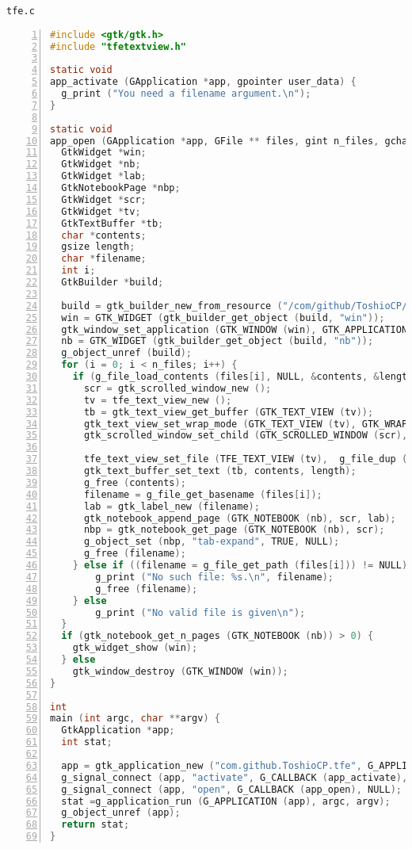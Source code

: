 \passthrough{\lstinline!tfe.c!}

\begin{lstlisting}[language=C, numbers=left]
#include <gtk/gtk.h>
#include "tfetextview.h"

static void
app_activate (GApplication *app, gpointer user_data) {
  g_print ("You need a filename argument.\n");
}

static void
app_open (GApplication *app, GFile ** files, gint n_files, gchar *hint, gpointer user_data) {
  GtkWidget *win;
  GtkWidget *nb;
  GtkWidget *lab;
  GtkNotebookPage *nbp;
  GtkWidget *scr;
  GtkWidget *tv;
  GtkTextBuffer *tb;
  char *contents;
  gsize length;
  char *filename;
  int i;
  GtkBuilder *build;

  build = gtk_builder_new_from_resource ("/com/github/ToshioCP/tfe3/tfe.ui");
  win = GTK_WIDGET (gtk_builder_get_object (build, "win"));
  gtk_window_set_application (GTK_WINDOW (win), GTK_APPLICATION (app));
  nb = GTK_WIDGET (gtk_builder_get_object (build, "nb"));
  g_object_unref (build);
  for (i = 0; i < n_files; i++) {
    if (g_file_load_contents (files[i], NULL, &contents, &length, NULL, NULL)) {
      scr = gtk_scrolled_window_new ();
      tv = tfe_text_view_new ();
      tb = gtk_text_view_get_buffer (GTK_TEXT_VIEW (tv));
      gtk_text_view_set_wrap_mode (GTK_TEXT_VIEW (tv), GTK_WRAP_WORD_CHAR);
      gtk_scrolled_window_set_child (GTK_SCROLLED_WINDOW (scr), tv);

      tfe_text_view_set_file (TFE_TEXT_VIEW (tv),  g_file_dup (files[i]));
      gtk_text_buffer_set_text (tb, contents, length);
      g_free (contents);
      filename = g_file_get_basename (files[i]);
      lab = gtk_label_new (filename);
      gtk_notebook_append_page (GTK_NOTEBOOK (nb), scr, lab);
      nbp = gtk_notebook_get_page (GTK_NOTEBOOK (nb), scr);
      g_object_set (nbp, "tab-expand", TRUE, NULL);
      g_free (filename);
    } else if ((filename = g_file_get_path (files[i])) != NULL) {
        g_print ("No such file: %s.\n", filename);
        g_free (filename);
    } else
        g_print ("No valid file is given\n");
  }
  if (gtk_notebook_get_n_pages (GTK_NOTEBOOK (nb)) > 0) {
    gtk_widget_show (win);
  } else
    gtk_window_destroy (GTK_WINDOW (win));
}

int
main (int argc, char **argv) {
  GtkApplication *app;
  int stat;

  app = gtk_application_new ("com.github.ToshioCP.tfe", G_APPLICATION_HANDLES_OPEN);
  g_signal_connect (app, "activate", G_CALLBACK (app_activate), NULL);
  g_signal_connect (app, "open", G_CALLBACK (app_open), NULL);
  stat =g_application_run (G_APPLICATION (app), argc, argv);
  g_object_unref (app);
  return stat;
}
\end{lstlisting}

